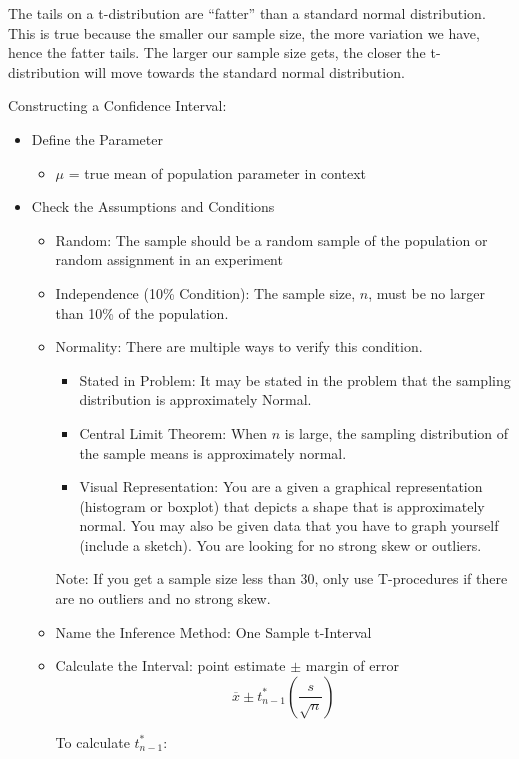 \documentclass[../stats.tex]{subfiles}
\begin{document}
The tails on a t-distribution are ``fatter'' than a standard normal distribution. This is true because the smaller our sample size, the more variation we have, hence the fatter tails. The larger our sample size gets, the closer the t-distribution will move towards the standard normal distribution.

Constructing a Confidence Interval:
\begin{itemize}
    \item Define the Parameter
    \begin{itemize}
        \item $\mu$ = true mean of {population parameter in context}
    \end{itemize}
    \item Check the Assumptions and Conditions 
    \begin{itemize}
        \item Random: The sample should be a random sample of the population or random assignment in an experiment 
        \item Independence (10\% Condition): The sample size, $n$, must be no larger than 10\% of the population.
        \item Normality: There are multiple ways to verify this condition.
        \begin{itemize}
            \item Stated in Problem: It may be stated in the problem that the sampling distribution is approximately Normal.
            \item Central Limit Theorem: When $n$ is large, the sampling distribution of the sample means is approximately normal.
            \item Visual Representation: You are a given a graphical representation (histogram or boxplot) that depicts a shape that is approximately normal. You may also be given data that you have to graph yourself (include a sketch). You are looking for no strong skew or outliers.
        \end{itemize}
        Note: If you get a sample size less than 30, only use T-procedures if there are no outliers and no strong skew.

        \item Name the Inference Method: One Sample t-Interval 
        \item Calculate the Interval: point estimate $\pm$ margin of error 
        \[ \overline{x}\pm t^*_{n-1}\left(\frac{s}{\sqrt{n}}\right) \]
        
        To calculate $t^*_{n-1}$: 


\end{itemize}
\end{itemize}
\end{document}
